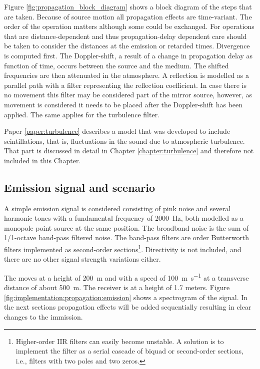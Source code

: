 Figure \ref{fig:propagation_block_diagram} shows a block diagram of the steps
that are taken. Because of source motion all propagation effects are
time-variant. The order of the operation matters although some could be
exchanged. For operations that are distance-dependent and thus propagation-delay dependent care should be taken to
consider the distances at the emission or retarded times. Divergence is computed
first. The Doppler-shift, a result of a change in propagation delay as function
of time, occurs between the source and the medium. The shifted frequencies are
then attenuated in the atmosphere. A reflection is modelled as a parallel path
with a filter representing the reflection coefficient. In case there is no
movement this filter may be considered part of the mirror source, however, as
movement is considered it needs to be placed after the Doppler-shift has been
applied. The same applies for the turbulence filter.

Paper \ref{paper:turbulence} describes a model that was developed to include
scintillations, that is, fluctuations in the sound due to atmospheric
turbulence. That part is discussed in detail in Chapter \ref{chapter:turbulence}
and therefore not included in this Chapter.

\subsection{Emission signal and scenario}
A simple emission signal is considered consisting of pink noise and several harmonic tones with a
fundamental frequency of \SI{2000}{\hertz}, both modelled as a monopole point
source at the same position. The broadband noise is the sum of 1/1-octave
band-pass filtered noise. The band-pass filters are  order Butterworth
filters implemented as second-order sections\footnote{
Higher-order IIR filters can easily become unstable. A solution is to implement
the filter as a serial cascade of biquad or second-order sections, i.e., filters
with two poles and two zeros.}. Directivity is not included, and
there are no other signal strength variations either.

The  moves at a height of \SI{200}{\meter} and with a
speed of \SI{100}{\meter\per\second} at a transverse distance of about \SI{500}{\meter}.
The receiver is at a height of 1.7 meters.
Figure \ref{fig:implementation:propagation:emission} shows a spectrogram of the
signal. In the next sections propagation effects will be added sequentially
resulting in clear changes to the immission.


